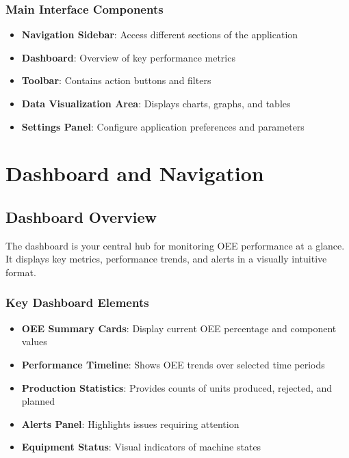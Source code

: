 \documentclass[12pt,a4paper]{report}
\begin{document}
\subsection{Main Interface Components}

\begin{itemize}
    \item \textbf{Navigation Sidebar}: Access different sections of the application
    \item \textbf{Dashboard}: Overview of key performance metrics
    \item \textbf{Toolbar}: Contains action buttons and filters
    \item \textbf{Data Visualization Area}: Displays charts, graphs, and tables
    \item \textbf{Settings Panel}: Configure application preferences and parameters
\end{itemize}

\chapter{Dashboard and Navigation}

\section{Dashboard Overview}

The dashboard is your central hub for monitoring OEE performance at a glance. It displays key metrics, performance trends, and alerts in a visually intuitive format.

\subsection{Key Dashboard Elements}

\begin{itemize}
    \item \textbf{OEE Summary Cards}: Display current OEE percentage and component values
    \item \textbf{Performance Timeline}: Shows OEE trends over selected time periods
    \item \textbf{Production Statistics}: Provides counts of units produced, rejected, and planned
    \item \textbf{Alerts Panel}: Highlights issues requiring attention
    \item \textbf{Equipment Status}: Visual indicators of machine states
\end{itemize}
\end{document}
